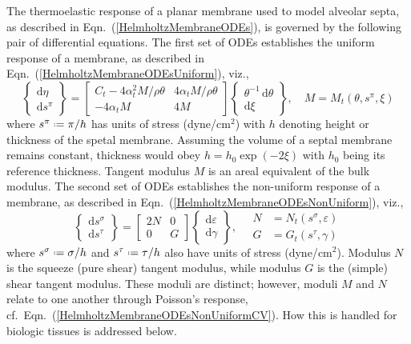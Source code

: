 The thermo\-elastic response of a planar membrane used to model alveolar septa, as described in Eqn.~(\ref{HelmholtzMembraneODEs}), is governed by the following pair of differential equations.  The first set of ODEs establishes the uniform response of a membrane, as described in Eqn.~(\ref{HelmholtzMembraneODEsUniform}), viz.,
\begin{displaymath}
    \left\{ \begin{matrix}
    \mathrm{d} \eta \\ \mathrm{d} s^{\pi}
    \end{matrix} \right\} = \begin{bmatrix}
    C_t - 4 \alpha^2_t M / \rho \theta & 
    4 \alpha_t M / \rho \theta \\
    -4 \alpha_t M & 4 M
    \end{bmatrix} \left\{ \begin{matrix}
    \theta^{-1} \, \mathrm{d} \theta \\ \mathrm{d} \xi
    \end{matrix} \right\} , \quad
    M = M_t ( \theta , s^{\pi} , \xi )
\end{displaymath}
where $s^{\pi} \defeq \pi / h$ has units of stress (dyne/$\text{cm}^2$) with $h$ denoting height or thickness of the spetal membrane.  Assuming the volume of a septal membrane remains constant, thickness would obey $h = h_0 \exp ( -2 \xi )$ with $h_0$ being its reference thickness.  Tangent modulus $M$ is an areal equivalent of the bulk modulus.  The second set of ODEs establishes the non-uniform response of a membrane, as described in Eqn.~(\ref{HelmholtzMembraneODEsNonUniform}), viz.,
\begin{displaymath}
    \left\{ \begin{matrix}
    \mathrm{d} s^{\sigma} \\ \mathrm{d} s^{\tau}
    \end{matrix} \right\} = \begin{bmatrix}
    2N & 0 \\
    0 & G
    \end{bmatrix} \left\{ \begin{matrix}
    \mathrm{d} \varepsilon \\ \mathrm{d} \gamma
    \end{matrix} \right\} , \quad
    \begin{aligned}
        N & = N_t ( s^{\sigma} , \varepsilon ) \\
        G & = G_t ( s^{\tau} , \gamma )
    \end{aligned}
\end{displaymath}
where $s^{\sigma} \defeq \sigma / h$ and $s^{\tau} \defeq \tau / h$ also have units of stress (dyne/$\text{cm}^2$).  Modulus $N$ is the squeeze (pure shear) tangent modulus, while modulus $G$ is the (simple) shear tangent modulus.  These moduli are distinct; however, moduli $M$ and $N$ relate to one another through Poisson's response, cf.\ Eqn.~(\ref{HelmholtzMembraneODEsNonUniformCV}).  How this is handled for biologic tissues is addressed below.

